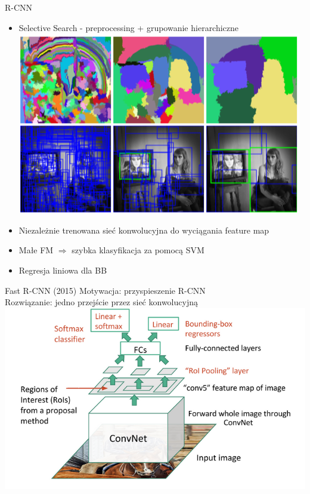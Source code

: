 \documentclass[11pt]{beamer}
\begin{document}
\begin{frame}{R-CNN}
\begin{itemize}
    \item Selective Search - preprocessing + grupowanie hierarchiczne \\
    \includegraphics[height=0.5\textheight]{grafika/selective.png}
    \item Niezależnie trenowana sieć konwolucyjna do wyciągania feature map
    \item Małe FM $\Rightarrow$ szybka klasyfikacja za pomocą SVM
    \item Regresja liniowa dla BB
\end{itemize}

\end{frame}

\begin{frame}{Fast R-CNN (2015)} 
Motywacja: przyspieszenie R-CNN \\
Rozwiązanie: jedno przejście przez sieć konwolucyjną
\includegraphics[width=\textwidth]{grafika/fastrcnn.png}
\end{frame}
\end{document}
